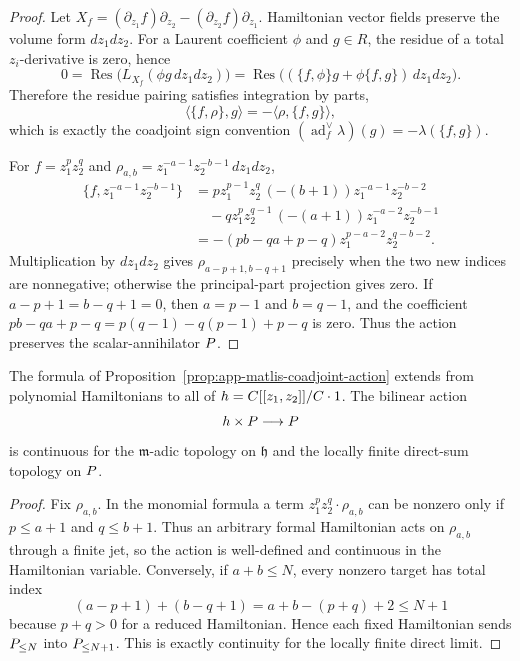 \begin{proof}
  Let \(X_f=(\partial_{z_1}f)\partial_{z_2}
  -(\partial_{z_2}f)\partial_{z_1}\).  Hamiltonian vector fields preserve
  the volume form \(dz_1dz_2\).  For a Laurent coefficient \(\phi\) and
  \(g\in R\), the residue of a total \(z_i\)-derivative is zero, hence
  \[
    0=\operatorname{Res}\bigl(L_{X_f}(\phi g\,dz_1dz_2)\bigr)
      =\operatorname{Res}\bigl((\{f,\phi\}g+\phi\{f,g\})\,dz_1dz_2\bigr).
  \]
  Therefore the residue pairing satisfies integration by parts,
  \[
    \langle \{f,\rho\},g\rangle
      =-\langle \rho,\{f,g\}\rangle ,
  \]
  which is exactly the coadjoint sign convention
  \((\operatorname{ad}^{\vee}_f\lambda)(g)=-\lambda(\{f,g\})\).

  For \(f=z_1^p z_2^q\) and
  \(\rho_{a,b}=z_1^{-a-1}z_2^{-b-1}\,dz_1dz_2\),
  \[
  \begin{aligned}
    \{f,z_1^{-a-1}z_2^{-b-1}\}
      &=
      pz_1^{p-1}z_2^q\,(-(b+1))z_1^{-a-1}z_2^{-b-2}  \\
      &\quad
      -qz_1^p z_2^{q-1}\,(-(a+1))z_1^{-a-2}z_2^{-b-1} \\
      &=-(pb-qa+p-q)z_1^{p-a-2}z_2^{q-b-2}.
  \end{aligned}
  \]
  Multiplication by \(dz_1dz_2\) gives
  \(\rho_{a-p+1,b-q+1}\) precisely when the two new indices are
  nonnegative; otherwise the principal-part projection gives zero.  If
  \(a-p+1=b-q+1=0\), then \(a=p-1\) and \(b=q-1\), and the coefficient
  \(pb-qa+p-q=p(q-1)-q(p-1)+p-q\) is zero.  Thus the action preserves the
  scalar-annihilator \(P\).
\end{proof}

\begin{lem}
\label{lem:app-matlis-coadjoint-continuity}
  The formula of Proposition~\ref{prop:app-matlis-coadjoint-action}
  extends from polynomial Hamiltonians to all of
  \(h=C[[z_1,z_2]]/C\cdot1\).  The bilinear action
  \[
    h\times P\longrightarrow P
  \]
  is continuous for the \(\mathfrak m\)-adic topology on \(\mathfrak h\)
  and the locally finite direct-sum topology on \(P\).
\end{lem}

\begin{proof}
  Fix \(\rho_{a,b}\).  In the monomial formula a term
  \(z_1^p z_2^q\cdot\rho_{a,b}\) can be nonzero only if
  \(p\leq a+1\) and \(q\leq b+1\).  Thus an arbitrary formal Hamiltonian
  acts on \(\rho_{a,b}\) through a finite jet, so the action is
  well-defined and continuous in the Hamiltonian variable.  Conversely,
  if \(a+b\leq N\), every nonzero target has total index
  \[
    (a-p+1)+(b-q+1)=a+b-(p+q)+2\leq N+1
  \]
  because \(p+q>0\) for a reduced Hamiltonian.  Hence each fixed
  Hamiltonian sends \(P_{\leq N}\) into \(P_{\leq N+1}\).  This is
  exactly continuity for the locally finite direct limit.
\end{proof}

